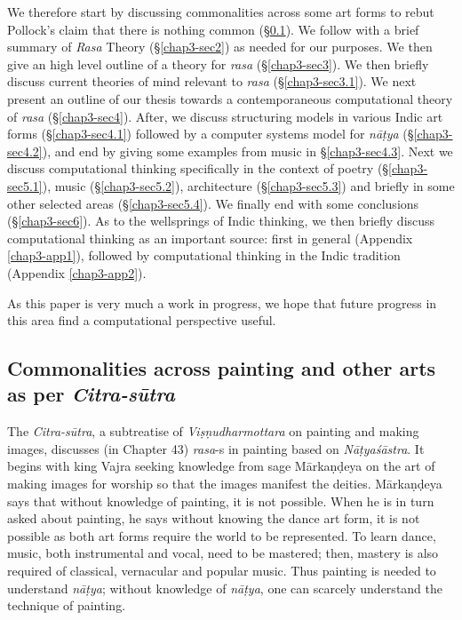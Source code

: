 We therefore start by discussing commonalities across some art forms to rebut Pollock’s claim that there is nothing common (\S\ref{chap3-sec1.3}). We follow with a brief summary of \textsl{Rasa} Theory (\S\ref{chap3-sec2}) as needed for our purposes. We then give an high level outline of a theory for \textsl{rasa} (\S\ref{chap3-sec3}). We then briefly discuss current theories of mind relevant to \textsl{rasa} (\S\ref{chap3-sec3.1}). We next present an outline of our thesis towards a contemporaneous computational theory of \textsl{rasa} (\S\ref{chap3-sec4}). After, we discuss structuring models in various Indic art forms (\S\ref{chap3-sec4.1}) followed by a computer systems model for \textsl{nāṭya} (\S\ref{chap3-sec4.2}), and end by giving some examples from music in \S\ref{chap3-sec4.3}. Next we discuss computational thinking specifically in the context of poetry (\S\ref{chap3-sec5.1}), music (\S\ref{chap3-sec5.2}), architecture (\S\ref{chap3-sec5.3}) and briefly in some other selected areas (\S\ref{chap3-sec5.4}). We finally end with some conclusions (\S\ref{chap3-sec6}). As to the wellsprings of Indic thinking, we then briefly discuss computational thinking as an important source: first in general (Appendix \ref{chap3-app1}), followed by computational thinking in the Indic tradition (Appendix \ref{chap3-app2}). 

As this paper is very much a work in progress, we hope that future progress in this area find a computational perspective useful.

\subsection{Commonalities across painting and other arts as per \textsl{Citra-sūtra}}\label{chap3-sec1.3}

The \textsl{Citra-sūtra}, a subtreatise of \textsl{Viṣṇudharmottara} on painting and making images, discusses (in Chapter 43) \textsl{rasa}-s in painting based on \textsl{Nāṭyaśāstra}. It begins with king Vajra seeking knowledge from sage Mārkaṇḍeya on the art of making images for worship so that the images manifest the deities. Mārkaṇḍeya says that without knowledge of painting, it is not possible. When he is in turn asked about painting, he says without knowing the dance art form, it is not possible as both art forms require the world to be represented. To learn dance, music, both instrumental and vocal, need to be mastered; then, mastery is also required of classical, vernacular and popular music. Thus painting is needed to understand \textsl{nāṭya}; without knowledge of \textsl{nāṭya}, one can scarcely understand the technique of painting. 

